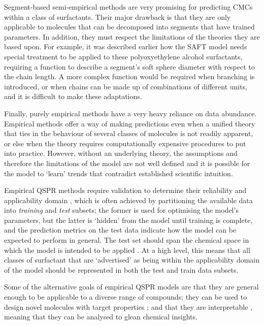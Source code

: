 Segment-based semi-empirical methods are very promising for predicting CMCs
within a class of surfactants. Their major drawback is that they are only
applicable to molecules that can be decomposed into segments that have trained
parameters. In addition, they must respect the limitations of the theories they
are based upon. For example, it was described earlier how the SAFT model needs
special treatment to be applied to these polyoxyethylene alcohol surfactants,
requiring a function to describe a segment's soft sphere diameter with respect
to the chain length. A more complex function would be required when branching is
introduced, or when chains can be made up of combinations of different units,
and it is difficult to make these adaptations.

Finally, purely empirical methods have a very heavy reliance on data abundance.
Empirical methods offer a way of making predictions even when a unified theory
that ties in the behaviour of several classes of molecules is not readily
apparent, or else when the theory requires computationally expensive procedures
to put into practice. However, without an underlying theory, the assumptions and
therefore the limitations of the model are not well defined and it is possible
for the model to `learn' trends that contradict established scientific
intuition.

Empirical QSPR methods require validation to determine their reliability and
applicability domain
\cite{veerasamyValidationQSARModelsstrategies2011,tropshaBestPracticesQSAR2010,leonardSelectionTrainingTest2006},
which is often achieved by partitioning the available data into \emph{training}
and \emph{test} subsets; the former is used for optimising the model's
parameters, but the latter is `hidden' from the model until training is
complete, and the prediction metrics on the test data indicate how the model can
be expected to perform in general. The test set should span the chemical space
in which the model is intended to be applied
\cite{leonardSelectionTrainingTest2006}. At a high level, this means that all
classes of surfactant that are `advertised' as being within the applicability
domain of the model should be represented in both the test and train data
subsets.

Some of the alternative goals of empirical QSPR models are that they are general
enough to be applicable to a diverse range of compounds; they can be used to
design novel molecules with target properties
\cite{gantzerInverseQSPRNovoDesign2020,bolboacaMolecularDesignQSARs2013}; and
that they are interpretable \cite{zefirovFragmentalApproachQSPR2002}, meaning
that they can be analysed to glean chemical insights.

